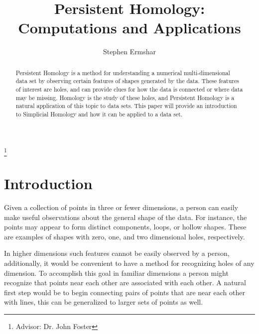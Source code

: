 

\title[Persistent Homology]{Persistent Homology: Computations and Applications}
\author{Stephen Ermshar}
\address{Walla Walla University}
\thanks{Advisor: Dr. John Foster}

\date{} %



\begin{abstract}
    Persistent Homology is a method for understanding a numerical multi-dimensional data set by observing certain features of shapes generated by the data.
    These features of interest are holes, and can provide clues for how the data is connected or where data may be missing.
    Homology is the study of these holes, and Persistent Homology is a natural application of this topic to data sets.
    This paper will provide an introduction to Simplicial Homology and how it can be applied to a data set.
\end{abstract}
\maketitle

\section{Introduction}

Given a collection of points in three or fewer dimensions, a person can easily make useful observations about the general shape of the data.
For instance, the points may appear to form distinct components, loops, or hollow shapes.
These are examples of shapes with zero, one, and two dimensional holes, respectively.

In higher dimensions such features cannot be easily observed by a person, additionally, it would be convenient to have a method for recognizing holes of any dimension.
To accomplish this goal in familiar dimensions a person might recognize that points near each other are associated with each other.
A natural first step would be to begin connecting pairs of points that are near each other with lines, this can be generalized to larger sets of points as well.


%     

